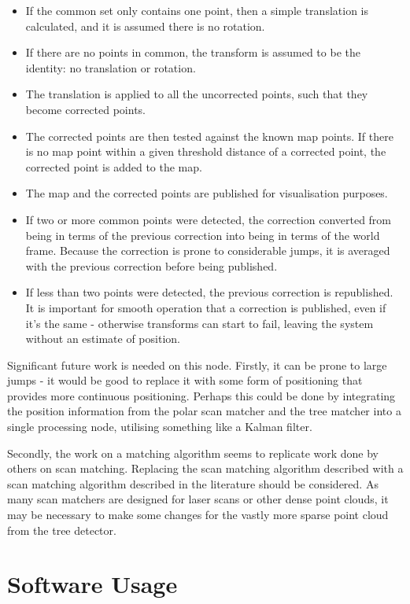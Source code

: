 \documentclass[12pt,oneside,a4paper]{book}
\begin{document}
\begin{itemize}
\item If the common set only contains one point, then a simple
  translation is calculated, and it is assumed there is no rotation.
\item If there are no points in common, the transform is assumed to be
  the identity: no translation or rotation.
\item The translation is applied to all the uncorrected points, such
  that they become corrected points.
\item The corrected points are then tested against the known map
  points. If there is no map point within a given threshold distance
  of a corrected point, the corrected point is added to the map.
\item The map and the corrected points are published for visualisation
  purposes.
\item If two or more common points were detected, the correction
  converted from being in terms of the previous correction into being
  in terms of the world frame. Because the correction is prone to
  considerable jumps, it is averaged with the previous correction
  before being published. 
\item If less than two points were detected, the previous correction
  is republished. It is important for smooth operation that a
  correction is published, even if it's the same - otherwise
  transforms can start to fail, leaving the system without an estimate
  of position.
\end{itemize}

Significant future work is needed on this node.  Firstly, it can be
prone to large jumps - it would be good to replace it with some form
of positioning that provides more continuous positioning. Perhaps this
could be done by integrating the position information from the polar
scan matcher and the tree matcher into a single processing node,
utilising something like a Kalman filter.

Secondly, the work on a matching algorithm seems to replicate work
done by others on scan matching. Replacing the scan matching algorithm
described with a scan matching algorithm described in the literature
should be considered. As many scan matchers are designed for laser
scans or other dense point clouds, it may be necessary to make some
changes for the vastly more sparse point cloud from the tree detector.

\section{Software Usage}
\label{sec:software-usage}
\end{document}
